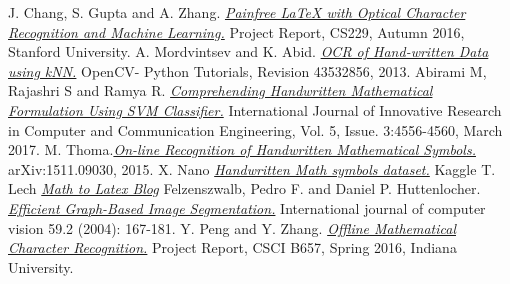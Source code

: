 \documentclass[11pt]{article}
\begin{document}
\begin{thebibliography}{1}
 J. Chang, S. Gupta and A. Zhang. \href{http://cs229.stanford.edu/proj2016/report/ChangGuptaZhang-PainfreeLatexWithOpticalCharacterRecognitionAndMachineLearning-report.pdf}{\emph{Painfree LaTeX with Optical Character Recognition and Machine Learning.}}  Project Report, CS229, Autumn 2016, Stanford University.
 A. Mordvintsev and K. Abid. \href{http://opencv-python-tutroals.readthedocs.io/en/latest/py_tutorials/py_ml/py_knn/py_knn_opencv/py_knn_opencv.html}{\emph{OCR of Hand-written Data using kNN.}} OpenCV- Python Tutorials, Revision 43532856, 2013.
 Abirami M, Rajashri S and Ramya R. \href{https://ijircce.com/upload/2017/march/177_Comprehending.pdf}{\emph{Comprehending Handwritten Mathematical Formulation Using SVM Classifier.}} International Journal of Innovative Research in Computer
and Communication Engineering, Vol. 5, Issue. 3:4556-4560, March 2017.
 M. Thoma.\href{https://arxiv.org/pdf/1511.09030.pdf}{\emph{On-line Recognition of Handwritten Mathematical Symbols.}} arXiv:1511.09030, 2015.
 X. Nano \href{https://www.kaggle.com/xainano/handwrittenmathsymbols}{\emph{Handwritten Math symbols dataset.}} Kaggle
 T. Lech \href{http://blog.mathocr.com/}{\emph{Math to Latex Blog}}
Felzenszwalb, Pedro F. and Daniel P. Huttenlocher. \href{http://people.cs.uchicago.edu/~pff/papers/seg-ijcv.pdf}{\emph{Efficient Graph-Based Image Segmentation.}} International journal of computer vision 59.2 (2004): 167-181.
 Y. Peng and Y. Zhang. \href{http://vision.soic.indiana.edu/b657/sp2016/projects/yisupeng/paper.pdf}{\emph{Offline Mathematical Character Recognition.}} Project Report, CSCI B657, Spring 2016, Indiana University.

\end{thebibliography}
\end{document}
